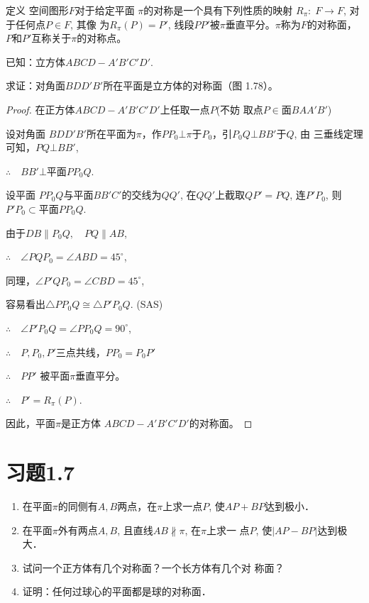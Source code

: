 \begin{blk}
  {定义} 空间图形$F$对于给定平面
$\pi$的对称是一个具有下列性质的映射
$R_{\pi}:\; F\to F$, 对于任何点$P\in F$, 其像
为$R_{\pi}(P)=P'$, 线段$PP'$被$\pi$垂直平分。$\pi$称为$F$的对称面，
$P$和$P'$互称关于$\pi$的对称点。
\end{blk}


\begin{example}
  已知：立方体$ABCD-A' B'C' D'$.

  求证：对角面$BDD'B'$所在平面是立方体的对称面（图
  1.78）。
\end{example}

\begin{proof}
  在正方体$ABCD-  A'B'C'D'$上任取一点$P$(不妨
  取点$P\in$面$BAA'B'$) 
  
  设对角面
  $BDD'B'$所在平面为$\pi$，作$PP_0
  \bot \pi$于$P_0$，引$P_0Q\bot BB'$于$Q$, 由
  三垂线定理可知，$PQ\bot BB'$, 

  $\therefore\quad BB'\bot $平面$PP_0Q$.
  
  设平面
  $PP_0Q$与平面$BB'C'$的交线为$QQ'$, 在$QQ'$上截取$QP'=PQ$, 
  连$P'P_0$, 则$P'P_0\subset $平面$PP_0Q$. 
  
  由于$DB\parallel P_0Q,\quad PQ\parallel AB$,

$\therefore\quad \angle PQP_0=\angle ABD=45^{\circ}$, 

同理，$\angle P'QP_0=\angle CBD=45^{\circ}$, 

容易看出$\triangle PP_0Q\cong \triangle P'P_0Q$. (SAS)

$\therefore\quad \angle P'P_0Q=\angle PP_0Q=90^{\circ}$,

$\therefore\quad P,P_0,P'$三点共线，$PP_0=P_0P'$

$\therefore\quad PP'$
  被平面$\pi$垂直平分。
  
  $\therefore\quad P'=R_{\pi}(P)$. 
  
  因此，平面$\pi$是正方体
  $ABCD-A'B'C'D'$的对称面。
\end{proof}


\section*{习题1.7}

\begin{enumerate}
    \item 在平面$\pi$的同侧有$A,B$两点，在$\pi$上求一点$P$, 使$AP+
    BP$达到极小．
    \item 在平面$\pi$外有两点$A,B$, 且直线$AB\nparallel \pi$, 在$\pi$上求一
    点$P$, 使$|AP-BP|$达到极大．
    \item 试问一个正方体有几个对称面？一个长方体有几个对
    称面？
    \item 证明：任何过球心的平面都是球的对称面．
\end{enumerate}

